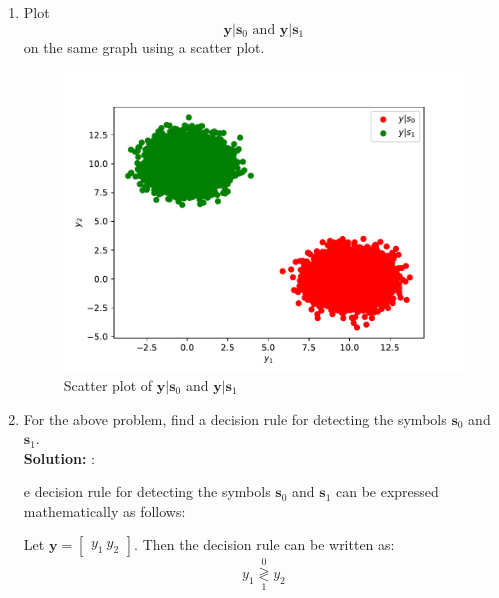 \documentclass[12pt]{book}
\providecommand{\mbf}{\mathbf}
\newcommand{\solution}{\noindent \textbf{Solution: }}
\providecommand{\dec}[2]{\ensuremath{\overset{#1}{\underset{#2}{\gtrless}}}}
\begin{document}
\begin{enumerate}
\item
\label{ch5_fsk}
Plot 
%
\begin{equation}
\mbf{y}|\mbf{s}_0 \text{ and } \mbf{y}|\mbf{s}_1
\end{equation}
%
on the same graph using a scatter plot.\\
\begin{center}
\end{center}
\begin{figure}[H]
\centering
\includegraphics[width=\columnwidth]{./figs/5/5.1.1.pdf}
\caption{Scatter plot of $\mbf{y}|\mbf{s}_0$ and $\mbf{y}|\mbf{s}_1$ }
\label{fig:5.1.1}
\end{figure}
\item
For the above problem, find a decision rule for detecting the symbols $\mbf{s}_0 $ and $\mbf{s}_1$.\\
\solution: 

e decision rule for detecting the symbols $\mbf{s}_0$ and $\mbf{s}_1$ can be expressed mathematically as follows:

Let $\mbf{y} = \begin{bmatrix} y_1 \ y_2 \end{bmatrix}$. Then the decision rule can be written as:
\begin{equation}
y_1 \dec{0}{1} y_2
\label{eq:5.1.2}
\end{equation}


\end{enumerate}
\end{document}
